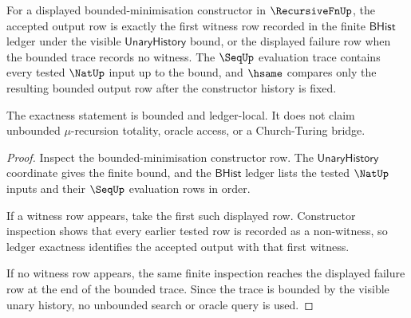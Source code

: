 \begin{theorem}
\label{thm:recursivefn-bounded-minimisation-ledger-exactness}
For a displayed bounded-minimisation constructor in $\RecursiveFnUp$, the
accepted output row is exactly the first witness row recorded in the finite
$\mathsf{BHist}$ ledger under the visible $\mathsf{UnaryHistory}$ bound, or the
displayed failure row when the bounded trace records no witness. The
$\SeqUp$ evaluation trace contains every tested $\NatUp$ input up to the bound,
and $\hsame$ compares only the resulting bounded output row after the
constructor history is fixed.

The exactness statement is bounded and ledger-local. It does not claim
unbounded $\mu$-recursion totality, oracle access, or a Church-Turing bridge.
\end{theorem}
\begin{proof}
Inspect the bounded-minimisation constructor row. The
$\mathsf{UnaryHistory}$ coordinate gives the finite bound, and the
$\mathsf{BHist}$ ledger lists the tested $\NatUp$ inputs and their
$\SeqUp$ evaluation rows in order.

If a witness row appears, take the first such displayed row. Constructor
inspection shows that every earlier tested row is recorded as a non-witness,
so ledger exactness identifies the accepted output with that first witness.

If no witness row appears, the same finite inspection reaches the displayed
failure row at the end of the bounded trace. Since the trace is bounded by the
visible unary history, no unbounded search or oracle query is used.
\end{proof}

